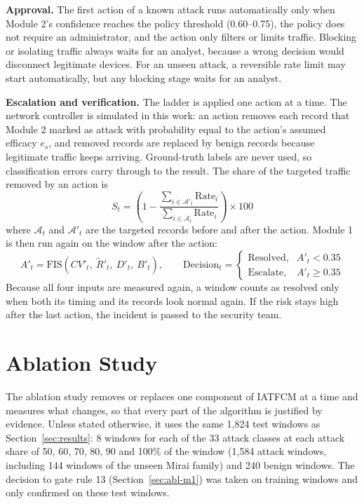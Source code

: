 \documentclass[]{interact}
\theoremstyle{plain}
\theoremstyle{definition}
\begin{document}
\textbf{Approval.} The first action of a known attack runs automatically only when Module 2's confidence reaches the policy threshold (0.60--0.75), the policy does not require an administrator, and the action only filters or limits traffic. Blocking or isolating traffic always waits for an analyst, because a wrong decision would disconnect legitimate devices. For an unseen attack, a reversible rate limit may start automatically, but any blocking stage waits for an analyst.

\textbf{Escalation and verification.} The ladder is applied one action at a time. The network controller is simulated in this work: an action removes each record that Module 2 marked as attack with probability equal to the action's assumed efficacy $e_s$, and removed records are replaced by benign records because legitimate traffic keeps arriving. Ground-truth labels are never used, so classification errors carry through to the result. The share of the targeted traffic removed by an action is
\begin{equation}
  S_t = \left(1 - \frac{\sum_{i \in \mathcal{A}'_t} \mathrm{Rate}_i}{\sum_{i \in \mathcal{A}_t} \mathrm{Rate}_i}\right) \times 100
\end{equation}
where $\mathcal{A}_t$ and $\mathcal{A}'_t$ are the targeted records before and after the action. Module 1 is then run again on the window after the action:
\begin{equation}
  A'_t = \mathrm{FIS}\left(CV'_t,\ \tilde{R}'_t,\ D'_t,\ B'_t\right),\qquad
  \text{Decision}_t = \begin{cases} \text{Resolved}, & A'_t < 0.35\\ \text{Escalate}, & A'_t \ge 0.35 \end{cases}
\end{equation}
Because all four inputs are measured again, a window counts as resolved only when both its timing and its records look normal again. If the risk stays high after the last action, the incident is passed to the security team.

\section{Ablation Study}\label{sec:ablation}
The ablation study removes or replaces one component of IATFCM at a time and measures what changes, so that every part of the algorithm is justified by evidence. Unless stated otherwise, it uses the same 1,824 test windows as Section~\ref{sec:results}: 8 windows for each of the 33 attack classes at each attack share of 50, 60, 70, 80, 90 and 100\% of the window (1,584 attack windows, including 144 windows of the unseen Mirai family) and 240 benign windows. The decision to gate rule 13 (Section~\ref{sec:abl-m1}) was taken on training windows and only confirmed on these test windows.
\end{document}
